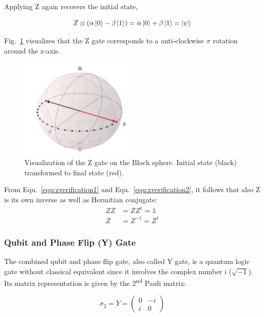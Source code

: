 Applying Z again recovers the initial state,

\begin{equation}
\label{equ:zverification2}
Z \otimes (\alpha \ket{0} - \beta \ket{1}) = \alpha \ket{0} + \beta \ket{1} = \ket{\psi}
\end{equation}

Fig.~\ref{img:blochzgate} visualizes that the Z gate corresponds to a anti-clockwise $\pi$ rotation around the z-axis.

\begin{figure}[ht]
   \centering
   \includegraphics[width=0.5\textwidth]{img/blochzgate.png}
   \caption{Visualization of the Z gate on the Bloch sphere. Initial state (black) transformed to final state (red).}
   \label{img:blochzgate}
\end{figure}

From Equ.~\ref{equ:zverification1} and Equ.~\ref{equ:zverification2}, it follows that also Z is its own inverse as well as Hermitian conjugate:
\begin{align}
ZZ &= ZZ^\dagger = \mathbb{1} \\
Z &= Z^{-1} = Z^\dagger
\end{align}

\subsubsection{Qubit and Phase Flip (Y) Gate}
\label{subsubsubsec:ygate}

The combined qubit and phase flip gate, also called Y gate, is a quantum logic gate without classical equivalent since it involves the complex number i ($\sqrt{-1}$). Its matrix representation is given by the 2\textsuperscript{nd} Pauli matrix:

\begin{equation}
\sigma_{2} = Y = \begin{pmatrix}
 0 & -i \\ 
 i & 0
 \end{pmatrix}
\end{equation}

